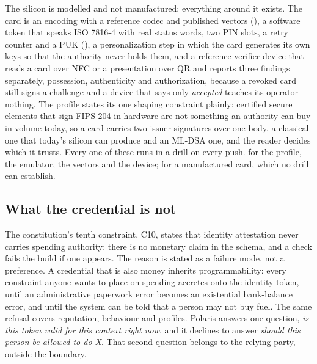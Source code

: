 The silicon is modelled and not manufactured; everything around it exists. The card is an encoding with a
reference codec and published vectors (), a software token that
speaks ISO 7816-4 with real status words, two PIN slots, a retry counter and a PUK
(), a personalization step in which the card generates its own keys so that the
authority never holds them, and a reference verifier device that reads a card over NFC or a
presentation over QR and reports three findings separately, possession, authenticity and
authorization, because a revoked card still signs a challenge and a device that says only
\emph{accepted} teaches its operator nothing. The profile states its one shaping constraint plainly:
certified secure elements that sign FIPS 204 in hardware are not something an authority can buy in
volume today, so a card carries two issuer signatures over one body, a classical one that today's
silicon can produce and an ML-DSA one, and the reader decides which it trusts. Every one of these
runs in a drill on every push. \sImplMark{} for the profile, the emulator, the vectors and the device;
\sFut{} for a manufactured card, which no drill can establish.


\subsection{What the credential is not}

The constitution's tenth constraint, C10, states that identity attestation never carries spending
authority: there is no monetary claim in the schema, and a check fails the build if one appears. The
reason is stated as a failure mode, not a preference. A credential that is also money inherits
programmability: every constraint anyone wants to place on spending accretes onto the identity token,
until an administrative paperwork error becomes an existential bank-balance error, and until the
system can be told that a person may not buy fuel. The same refusal covers reputation, behaviour and
profiles. Polaris answers one question, \emph{is this token valid for this context right now}, and
it declines to answer \emph{should this person be allowed to do X}. That second question belongs to
the relying party, outside the boundary. \sImpl

